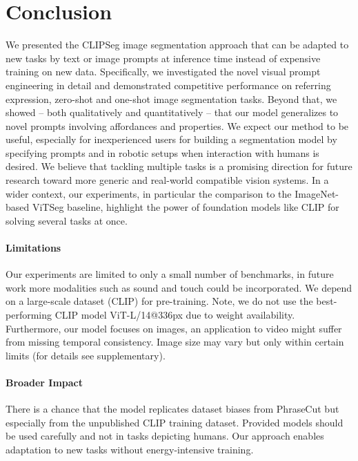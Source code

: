 \documentclass[10pt,twocolumn,letterpaper]{article}
\begin{document}
\section{Conclusion}

We presented the CLIPSeg image segmentation approach that can be adapted to new tasks by text or image prompts at inference time instead of expensive training on new data. 
Specifically, we investigated the novel visual prompt engineering in detail and demonstrated competitive performance on referring expression, zero-shot and one-shot image segmentation tasks.
Beyond that, we showed -- both qualitatively and quantitatively -- that our model generalizes to novel prompts involving affordances and properties.
We expect our method to be useful, especially for inexperienced users for building a segmentation model by specifying prompts and in robotic setups when interaction with humans is desired.
We believe that tackling multiple tasks is a promising direction for future research toward more generic and real-world compatible vision systems.
In a wider context, our experiments, in particular the comparison to the ImageNet-based ViTSeg baseline, highlight the power of foundation models like CLIP for solving several tasks at once.



\paragraph{Limitations}
Our experiments are limited to only a small number of benchmarks, in future work more modalities such as sound and touch could be incorporated. We depend on a large-scale dataset (CLIP) for pre-training. Note, we do not use the best-performing CLIP model ViT-L/14@336px due to weight availability. Furthermore, our model focuses on images, an application to video might suffer from missing temporal consistency. Image size may vary but only within certain limits (for details see supplementary).

\paragraph{Broader Impact}
There is a chance that the model replicates dataset biases from PhraseCut but especially from the unpublished CLIP training dataset. Provided models should be used carefully and not in tasks depicting humans.
Our approach enables adaptation to new tasks without energy-intensive training. 
\end{document}
